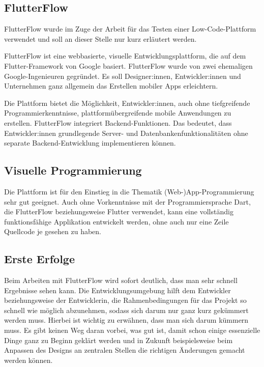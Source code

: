\documentclass[acmtog, language=ngerman]{acmart}
\begin{document}
\subsection{FlutterFlow}
FlutterFlow wurde im Zuge der Arbeit für das Testen einer Low-Code-Plattform verwendet und soll an dieser Stelle nur kurz erläutert werden.

FlutterFlow ist eine webbasierte, visuelle Entwicklungsplattform, die auf dem Flutter-Framework von Google basiert. FlutterFlow wurde von zwei ehemaligen Google-Ingenieuren gegründet. Es soll Designer:innen, Entwickler:innen und Unternehmen ganz allgemein das Erstellen mobiler Apps erleichtern.

Die Plattform bietet die Möglichkeit, Entwickler:innen, auch ohne tiefgreifende Programmierkenntnisse, plattformübergreifende mobile Anwendungen zu erstellen.
FlutterFlow integriert Backend-Funktionen. Das bedeutet, dass Entwickler:innen grundlegende Server- und Datenbankenfunktionalitäten ohne separate Backend-Entwicklung implementieren können. \cite{flutterflow_features}

\subsection{Visuelle Programmierung}
Die Plattform ist für den Einstieg in die Thematik (Web-)App-Programmierung sehr gut geeignet. Auch ohne Vorkenntnisse mit der Programmiersprache Dart, die FlutterFlow beziehungsweise Flutter verwendet, kann eine vollständig funktionsfähige Applikation entwickelt werden, ohne auch nur eine Zeile Quellcode je gesehen zu haben.

\subsection{Erste Erfolge}
Beim Arbeiten mit FlutterFlow wird sofort deutlich, dass man sehr schnell Ergebnisse sehen kann.
Die Entwicklungsumgebung hilft dem Entwickler beziehungsweise der Entwicklerin, die Rahmenbedingungen für das Projekt so schnell wie möglich abzunehmen, sodass sich darum nur ganz kurz gekümmert werden muss. Hierbei ist wichtig zu erwähnen, dass man sich darum kümmern muss. Es gibt keinen Weg daran vorbei, was gut ist, damit schon einige essenzielle Dinge ganz zu Beginn geklärt werden und in Zukunft beispielsweise beim Anpassen des Designs an zentralen Stellen die richtigen Änderungen gemacht werden können.
\end{document}
